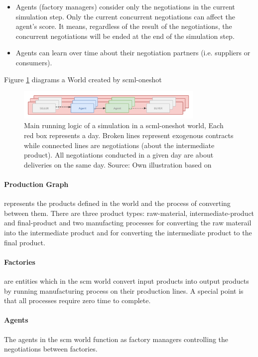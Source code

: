 \begin{itemize}
	\item Agents (factory managers) consider only the negotiations in the current simulation step. Only the current concurrent negotiations can affect the agent's score. It means, regardless of the result of the negotiations, the concurrent negotiations will be ended at the end of the simulation step. 
	\item Agents can learn over time about their negotiation partners (i.e. suppliers or consumers).
\end{itemize} 

Figure \ref{fig:overview-scml-oneshot} diagrams a World created by \gls{scml-oneshot}

\begin{figure}[htbp]
\centering
\includegraphics[width=0.8\textwidth]{./images/overview-scml-oneshot.png}
\caption{Main running logic of a simulation in a \gls{scml-oneshot} world, Each red box represents a day. Broken lines represent exogenous contracts while connected lines are negotiations (about the intermediate product). All negotiations conducted in a given day are about deliveries on the same day. Source: Own illustration based on\parencite{Mohammad2021}}
\label{fig:overview-scml-oneshot}
\end{figure}

\paragraph{Production Graph} represents the products defined in the world and the process of converting between them. There are three product types: raw-material, intermediate-product and final-product and two manufacting processes for converting the raw materail into the intermediate product and for converting the intermediate product to the final product.
\paragraph{Factories} are entities which in the \gls{scm} world convert input products into output products by running manufacturing process on their production lines. A special point is that all processes require zero time to complete.
\paragraph{Agents} The agents in the \gls{scm} world function as factory managers controlling the negotiations between factories.
